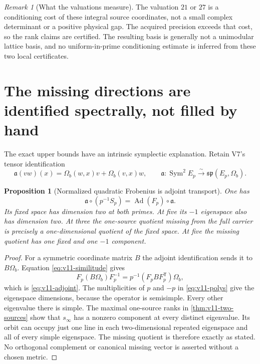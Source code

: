 \documentclass[11pt]{article}
\newtheorem{proposition}[proposition]{Proposition}
\theoremstyle{definition}
\theoremstyle{remark}
\newtheorem{remark}[remark]{Remark}
\begin{document}
\begin{remark}[What the valuations measure]
The valuation $21$ or $27$ is a conditioning cost of these integral
source coordinates, not a small complex determinant or a positive
physical gap. The acquired precision exceeds that cost, so the rank
claims are certified. The resulting basis is generally not a
unimodular lattice basis, and no uniform-in-prime conditioning estimate
is inferred from these two local certificates.
\end{remark}

\section{The missing directions are identified spectrally, not filled by hand}
\label{sec:v11-obstruction}

The exact upper bounds have an intrinsic symplectic explanation. Retain
V7's tensor identification
\[
 \mathfrak a(vw)(x)=\Omega_b(w,x)v+\Omega_b(v,x)w,
 \qquad\mathfrak a:\operatorname{Sym}^2E_p\xrightarrow{\sim}
 \mathfrak{sp}(E_p,\Omega_b).
\]

\begin{proposition}[Normalized quadratic Frobenius is adjoint transport]
\label{prop:v11-adjoint}
One has
\begin{equation}
 \boxed{
 \mathfrak a\circ(p^{-1}S_p)
 =\operatorname{Ad}(F_p)\circ\mathfrak a.}
 \label{eq:v11-adjoint}
\end{equation}
Its fixed space has dimension two at both primes. At five its
$-1$ eigenspace also has dimension two. At three the one-source
quotient missing from the full carrier is precisely a one-dimensional
quotient of the fixed space. At five the missing quotient has one
fixed and one $-1$ component.
\end{proposition}
\begin{proof}
For a symmetric coordinate matrix $B$ the adjoint identification sends
it to $B\Omega_b$. Equation \cref{eq:v11-similitude} gives
\[
 F_p(B\Omega_b)F_p^{-1}
  =p^{-1}(F_pBF_p^{\mathsf T})\Omega_b,
\]
which is \cref{eq:v11-adjoint}. The multiplicities of $p$ and $-p$
in \cref{eq:v11-polys} give the eigenspace dimensions, because the
operator is semisimple. Every other eigenvalue there is simple.
The maximal one-source ranks in \cref{thm:v11-two-sources} show
that $s_\infty$ has a nonzero component at every distinct eigenvalue.
Its orbit can occupy just one line in each two-dimensional repeated
eigenspace and all of every simple eigenspace. The missing quotient
is therefore exactly as stated. No orthogonal complement or canonical
missing vector is asserted without a chosen metric.
\end{proof}
\end{document}
